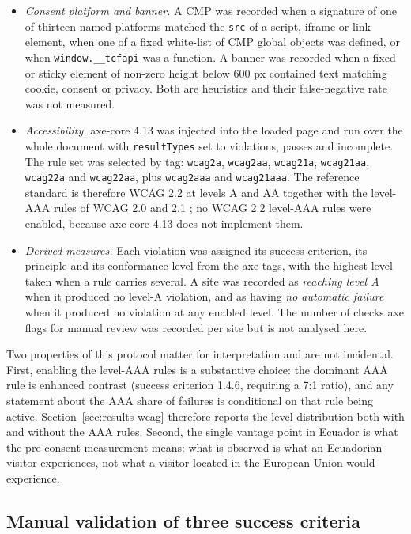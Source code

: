 \documentclass[]{interact}
\begin{document}
\begin{itemize}
	\item \emph{Consent platform and banner.} A CMP was recorded when a signature of one of thirteen named platforms matched the \verb|src| of a script, iframe or link element, when one of a fixed white-list of CMP global objects was defined, or when \verb|window.__tcfapi| was a function. A banner was recorded when a fixed or sticky element of non-zero height below 600 px contained text matching cookie, consent or privacy. Both are heuristics and their false-negative rate was not measured.
	\item \emph{Accessibility.} axe-core 4.13 \citep{axecore2026} was injected into the loaded page and run over the whole document with \verb|resultTypes| set to violations, passes and incomplete. The rule set was selected by tag: \verb|wcag2a|, \verb|wcag2aa|, \verb|wcag21a|, \verb|wcag21aa|, \verb|wcag22a| and \verb|wcag22aa|, plus \verb|wcag2aaa| and \verb|wcag21aaa|. The reference standard is therefore WCAG 2.2 at levels A and AA \citep{wcag22} together with the level-AAA rules of WCAG 2.0 and 2.1 \citep{wcag20,wcag21}; no WCAG 2.2 level-AAA rules were enabled, because axe-core 4.13 does not implement them.
	\item \emph{Derived measures.} Each violation was assigned its success criterion, its principle and its conformance level from the axe tags, with the highest level taken when a rule carries several. A site was recorded as \emph{reaching level A} when it produced no level-A violation, and as having \emph{no automatic failure} when it produced no violation at any enabled level. The number of checks axe flags for manual review was recorded per site but is not analysed here.
\end{itemize}

Two properties of this protocol matter for interpretation and are not incidental. First, enabling the level-AAA rules is a substantive choice: the dominant AAA rule is enhanced contrast (success criterion 1.4.6, requiring a 7:1 ratio), and any statement about the AAA share of failures is conditional on that rule being active. Section~\ref{sec:results-wcag} therefore reports the level distribution both with and without the AAA rules. Second, the single vantage point in Ecuador is what the pre-consent measurement means: what is observed is what an Ecuadorian visitor experiences, not what a visitor located in the European Union would experience.

\subsection{Manual validation of three success criteria}\label{sec:methods-manual}
\end{document}
